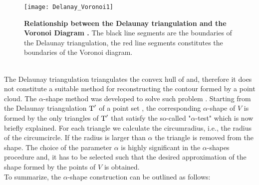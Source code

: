 \begin{figure}[t]
\centering
\texttt{[image: Delanay\_Voronoi1]}
\caption{\textbf{Relationship between the Delaunay triangulation and the Voronoi Diagram \cite{Wiki4}.} The black line segments are the boundaries of the Delaunay triangulation, the red line segments constitutes the boundaries of the Voronoi diagram.}
\label{fig:Voronoi}
\end{figure}
\\ \indent The Delaunay triangulation triangulates the convex hull of  and, therefore it does not constitute a suitable method for reconstructing the contour formed by a point cloud. The $\alpha$-shape method was developed to solve such problem \cite{edelsbrunner2010alpha, guo1997surface}. Starting from the Delaunay triangulation $\mbox{$\textup{T}$}^\prime$ of a point set , the corresponding $\alpha$-shape of $V$ is formed by the only triangles of $\mbox{$\textup{T}$}^\prime$ that satisfy the so-called "$\alpha$-test" which is now briefly explained.
For each triangle we calculate the circumradius, i.e., the radius of the circumcircle. If the radius is larger than $\alpha$ the triangle is removed from the shape. The choice of the parameter $\alpha$ is highly significant in the $\alpha$-shapes procedure and, it has to be selected such that the desired approximation of the shape formed by the points of $V$ is obtained.\\ \indent
To summarize, the $\alpha$-shape construction can be outlined as follows:
